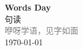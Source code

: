 \vspace*{\fill}
\begin{center}
    \textcolor{orange!50}{\Huge\textbf{Words Day}} \\[1em]
    \textcolor{orange!60!pink}{\Large 句读} \\[2em]
    \textcolor{gray}{\large 咿呀学语，见字如面} \\[1em]
    \today
\end{center}
\vspace*{\fill}
\clearpage


\clearpage

\clearpage
